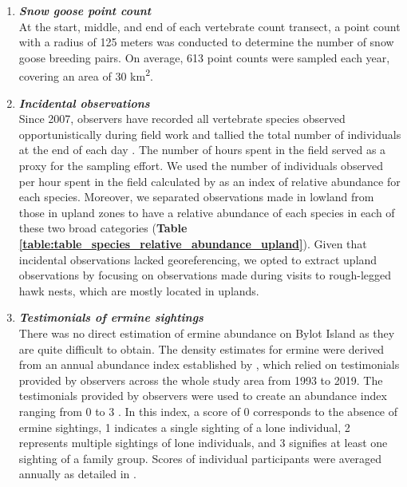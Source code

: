 \documentclass[a4paper,twoside,12pt]{article}
\begin{document}
\begin{enumerate}[label=\roman*]
\begin{figure}
\end{figure}
\newpage
\item[] \textit{\textbf{Snow goose point count}}\\
At the start, middle, and end of each vertebrate count transect, a point count with a radius of 125 meters was conducted to determine the number of snow goose breeding pairs. On average, 613  point counts were sampled each year, covering an area of 30  km\textsuperscript{2}.
\\
\item[] \textit{\textbf{Incidental observations}}\\
Since 2007, observers have recorded all vertebrate species observed opportunistically during field work and tallied the total number of individuals at the end of each day \citep{gauthier2020daily, gauthier2024a}. The number of hours spent in the field served as a proxy for the sampling effort. We used the number of individuals observed per hour spent in the field calculated by \citet{gauthier2024a} as an index of relative abundance for each species. Moreover, we separated observations made in lowland from those in upland zones to have a relative abundance of each species in each of these two broad categories (\textbf{Table \ref{table:table_species_relative_abundance_upland}}). Given that incidental observations lacked georeferencing, we opted to extract upland observations by focusing on observations made during visits to rough-legged hawk nests, which are mostly located in uplands. \\

\newpage
\item[] \textit{\textbf{Testimonials of ermine sightings}}\\
There was no direct estimation of ermine abundance on Bylot Island as they are quite difficult to obtain. The density estimates for ermine were derived from an annual abundance index established by \citet{bolduc2023}, which relied on testimonials provided by observers across the whole study area from 1993 to 2019. The testimonials provided by observers were used to create an abundance index ranging from 0 to 3 \citep{bolduc2023}. In this index, a score of 0 corresponds to the absence of ermine sightings, 1 indicates a single sighting of a lone individual, 2 represents multiple sightings of lone individuals, and 3 signifies at least one sighting of a family group. Scores of individual participants were averaged annually as detailed in \citet{bolduc2023}. 
\end{enumerate}
\end{document}
